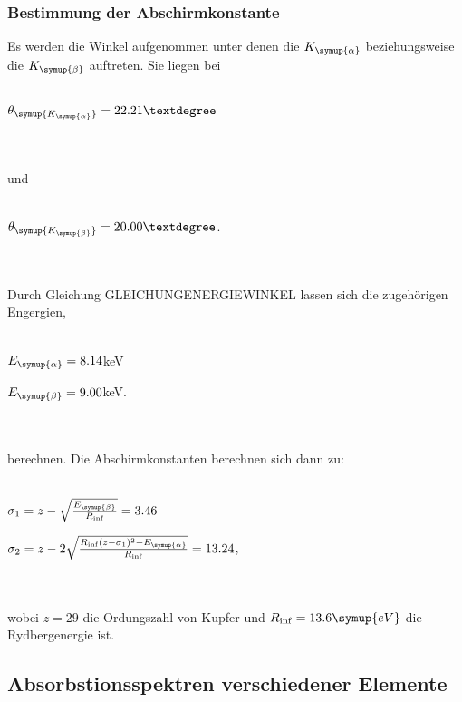     \subsubsection{Bestimmung der Abschirmkonstante}
        Es werden die Winkel aufgenommen unter denen die $K_{\symup{\alpha}}$ beziehungsweise die $K_{\symup{\beta}}$ auftreten.
        Sie liegen bei
        \\ \\
        \centerline{$\theta_{\symup{K_{\symup{\alpha}}}} = 22.21°$}
        \\ \\
        und 
        \\ \\
        \centerline{$\theta_{\symup{K_{\symup{\beta}}}} = 20.00°$.}
        \\ \\
        Durch Gleichung GLEICHUNGENERGIEWINKEL lassen sich die zugehörigen Engergien, 
        \\ \\
        \centerline{$E_{\symup{\alpha}} = 8.14 $keV}
        \centerline{$E_{\symup{\beta}} = 9.00 $keV.}
        \\ \\
        berechnen.
        Die Abschirmkonstanten berechnen sich dann zu:
        \\ \\
        \centerline{$\sigma_1 = z - \sqrt{\frac{E_{\symup{\beta}}}{R_{\inf}} } = 3.46 $}
        \centerline{$\sigma_2 = z - 2 \sqrt{\frac{R_{\inf}(z - \sigma_1)^2 - E_{\symup{\alpha}}}{R_{\inf}}} = 13.24 $,}
        \\ \\
        wobei $z = 29$ die Ordungszahl von Kupfer und $R_{\inf} = 13.6 \symup{eV}$ die Rydbergenergie ist.
\subsection{Absorbstionsspektren verschiedener Elemente}    